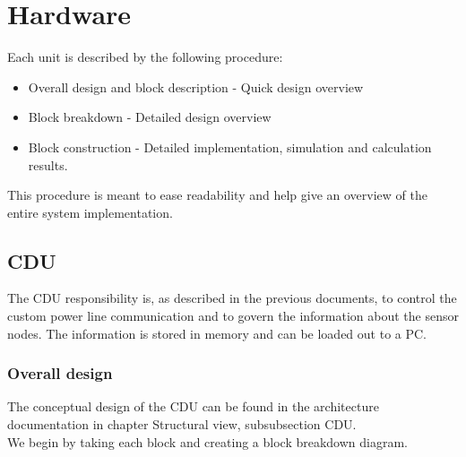 \chapter{Hardware}
Each unit is described by the following procedure:
\begin{itemize}
\item Overall design and block description - Quick design overview
\item Block breakdown - Detailed design overview
\item Block construction - Detailed implementation, simulation and calculation results.
\end{itemize}
This procedure is meant to ease readability and help give an overview of the entire system implementation.
\section{CDU}
The CDU responsibility is, as described in the previous documents, to control the custom power line communication and to govern the information about the sensor nodes. The information is stored in memory and can be loaded out to a PC.
\subsection{Overall design}
The conceptual design of the CDU can be found in the architecture documentation in chapter Structural view, subsubsection CDU.\\
We begin by taking each block and creating a block breakdown diagram.\\

